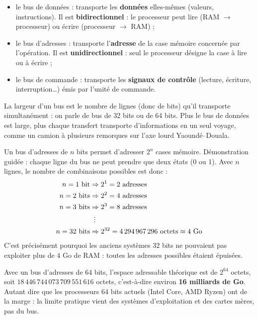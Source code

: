 \documentclass[11pt]{article}
\newcommand{\cle}[1]{{\popxbold\color{popdark}#1}}
\def\vdots{\mathord{\vbox{\baselineskip3.2pt\lineskiplimit0pt\kern4pt\hbox{.}\hbox{.}\hbox{.}}}}%
\begin{document}
\begin{itemize}
  \item le \cle{bus de données} : transporte les \textbf{données} elles-mêmes (valeurs, instructions). Il est \textbf{bidirectionnel} : le processeur peut lire (RAM $\rightarrow$ processeur) ou écrire (processeur $\rightarrow$ RAM) ;
  \item le \cle{bus d'adresses} : transporte l'\textbf{adresse} de la case mémoire concernée par l'opération. Il est \textbf{unidirectionnel} : seul le processeur désigne la case à lire ou à écrire ;
  \item le \cle{bus de commande} : transporte les \textbf{signaux de contrôle} (lecture, écriture, interruption\ldots) émis par l'unité de commande.
\end{itemize}

La \cle{largeur d'un bus} est le nombre de lignes (donc de bits) qu'il transporte simultanément : on parle de bus de 32 bits ou de 64 bits. Plus le bus de données est large, plus chaque transfert transporte d'informations en un seul voyage, comme un camion à plusieurs remorques sur l'axe lourd Yaoundé--Douala.

\begin{propriete}
Un bus d'adresses de $n$ bits permet d'adresser $2^n$ cases mémoire. Démonstration guidée : chaque ligne du bus ne peut prendre que deux états (0 ou 1). Avec $n$ lignes, le nombre de combinaisons possibles est donc :
\begin{align*}
n = 1 \text{ bit} &\Rightarrow 2^1 = 2 \text{ adresses} \\
n = 2 \text{ bits} &\Rightarrow 2^2 = 4 \text{ adresses} \\
n = 3 \text{ bits} &\Rightarrow 2^3 = 8 \text{ adresses} \\
&\;\;\vdots \\
n = 32 \text{ bits} &\Rightarrow 2^{32} = 4\,294\,967\,296 \text{ octets} \approx 4 \text{ Go}
\end{align*}
C'est précisément pourquoi les anciens systèmes 32 bits ne pouvaient pas exploiter plus de 4 Go de RAM : toutes les adresses possibles étaient épuisées.
\end{propriete}

\begin{exemplebox}
Avec un bus d'adresses de 64 bits, l'espace adressable théorique est de $2^{64}$ octets, soit $18\,446\,744\,073\,709\,551\,616$ octets, c'est-à-dire environ \textbf{16 milliards de Go}. Autant dire que les processeurs 64 bits actuels (Intel Core, AMD Ryzen) ont de la marge : la limite pratique vient des systèmes d'exploitation et des cartes mères, pas du bus.
\end{exemplebox}
\end{document}
